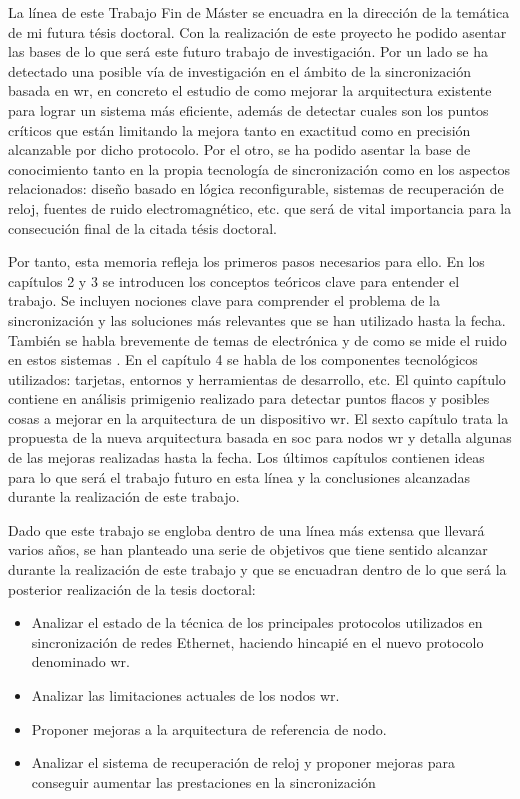 La línea de este Trabajo Fin de Máster se encuadra en la dirección de la 
temática de mi futura tésis doctoral. Con la realización de este proyecto he 
podido asentar las bases de lo que será este futuro trabajo de investigación. 
Por un lado se ha detectado una posible vía de investigación en el ámbito de la 
sincronización basada en \gls{wr}, en concreto el estudio de como mejorar la 
arquitectura existente para lograr un sistema más eficiente, además de detectar 
cuales son los puntos críticos que están limitando la mejora tanto en exactitud 
como en precisión alcanzable por dicho protocolo. Por el otro, se ha podido 
asentar la base de conocimiento tanto en la propia tecnología de sincronización 
como en los aspectos relacionados: diseño basado en lógica reconfigurable, 
sistemas de recuperación de reloj, fuentes de ruido electromagnético, etc. que 
será de vital importancia para la consecución final de la citada tésis doctoral.

Por tanto, esta memoria refleja los primeros pasos necesarios para ello. En los 
capítulos 2 y 3 se introducen los conceptos teóricos clave para entender el 
trabajo. Se incluyen nociones clave para comprender el problema de la 
sincronización y las soluciones más relevantes que se han utilizado hasta la 
fecha. También se habla brevemente de temas de electrónica y de como se mide el 
ruido en estos sistemas . En el capítulo 4 se habla de 
los componentes tecnológicos utilizados: tarjetas, entornos y herramientas de 
desarrollo, etc. El quinto capítulo contiene en análisis primigenio realizado 
para detectar puntos flacos y posibles cosas a mejorar en la arquitectura de un 
dispositivo \gls{wr}. El sexto capítulo trata la propuesta de la nueva 
arquitectura basada en \gls{soc} para nodos \gls{wr} y detalla algunas de las 
mejoras realizadas hasta la fecha. Los últimos capítulos contienen ideas para 
lo que será el trabajo futuro en esta línea y la conclusiones alcanzadas 
durante la realización de este trabajo.

Dado que este trabajo se engloba dentro de una línea más extensa que llevará 
varios años, se han planteado una serie de objetivos que tiene sentido alcanzar 
durante la realización de este trabajo y que se encuadran dentro de lo que será 
la posterior realización de la tesis doctoral:

\begin{itemize}
	\item Analizar el estado de la técnica de los principales protocolos 
	utilizados en sincronización de redes Ethernet, haciendo hincapié en el 
	nuevo protocolo denominado \gls{wr}.
	
	\item Analizar las limitaciones actuales de los nodos \gls{wr}.
	
	\item Proponer mejoras a la arquitectura de referencia de nodo.
	
	\item Analizar el sistema de recuperación de reloj y proponer mejoras para 
	conseguir aumentar las prestaciones en la sincronización 
\end{itemize}


